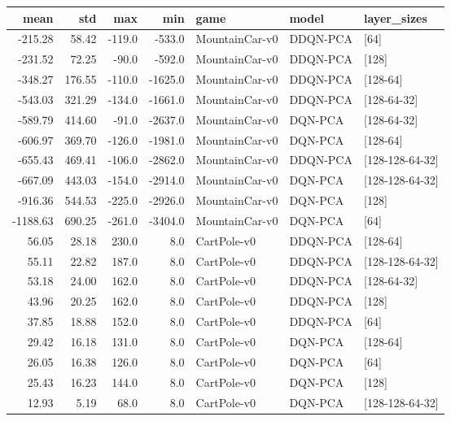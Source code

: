 \begin{tabular}{rrrrlll}
\toprule
    mean &     std &    max &     min &            game &     model &      layer\_sizes \\
\midrule
 -215.28 &   58.42 & -119.0 &  -533.0 &  MountainCar-v0 &  DDQN-PCA &             [64] \\
 -231.52 &   72.25 &  -90.0 &  -592.0 &  MountainCar-v0 &  DDQN-PCA &            [128] \\
 -348.27 &  176.55 & -110.0 & -1625.0 &  MountainCar-v0 &  DDQN-PCA &         [128-64] \\
 -543.03 &  321.29 & -134.0 & -1661.0 &  MountainCar-v0 &  DDQN-PCA &      [128-64-32] \\
 -589.79 &  414.60 &  -91.0 & -2637.0 &  MountainCar-v0 &   DQN-PCA &      [128-64-32] \\
 -606.97 &  369.70 & -126.0 & -1981.0 &  MountainCar-v0 &   DQN-PCA &         [128-64] \\
 -655.43 &  469.41 & -106.0 & -2862.0 &  MountainCar-v0 &  DDQN-PCA &  [128-128-64-32] \\
 -667.09 &  443.03 & -154.0 & -2914.0 &  MountainCar-v0 &   DQN-PCA &  [128-128-64-32] \\
 -916.36 &  544.53 & -225.0 & -2926.0 &  MountainCar-v0 &   DQN-PCA &            [128] \\
-1188.63 &  690.25 & -261.0 & -3404.0 &  MountainCar-v0 &   DQN-PCA &             [64] \\
   56.05 &   28.18 &  230.0 &     8.0 &     CartPole-v0 &  DDQN-PCA &         [128-64] \\
   55.11 &   22.82 &  187.0 &     8.0 &     CartPole-v0 &  DDQN-PCA &  [128-128-64-32] \\
   53.18 &   24.00 &  162.0 &     8.0 &     CartPole-v0 &  DDQN-PCA &      [128-64-32] \\
   43.96 &   20.25 &  162.0 &     8.0 &     CartPole-v0 &  DDQN-PCA &            [128] \\
   37.85 &   18.88 &  152.0 &     8.0 &     CartPole-v0 &  DDQN-PCA &             [64] \\
   29.42 &   16.18 &  131.0 &     8.0 &     CartPole-v0 &   DQN-PCA &         [128-64] \\
   26.05 &   16.38 &  126.0 &     8.0 &     CartPole-v0 &   DQN-PCA &             [64] \\
   25.43 &   16.23 &  144.0 &     8.0 &     CartPole-v0 &   DQN-PCA &            [128] \\
   12.93 &    5.19 &   68.0 &     8.0 &     CartPole-v0 &   DQN-PCA &  [128-128-64-32] \\

\end{tabular}
